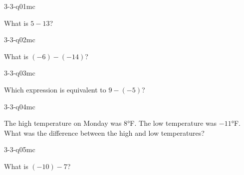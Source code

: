 

\begin{practiceQuestion}{3-3-q01}{mc}
\begin{questionText}
What is $5 - 13$?
\end{questionText}
\end{practiceQuestion}

\begin{practiceQuestion}{3-3-q02}{mc}
\begin{questionText}
What is $(-6) - (-14)$?
\end{questionText}
\end{practiceQuestion}

\begin{practiceQuestion}{3-3-q03}{mc}
\begin{questionText}
Which expression is equivalent to $9 - (-5)$?
\end{questionText}
\end{practiceQuestion}

\begin{practiceQuestion}{3-3-q04}{mc}
\begin{questionText}
The high temperature on Monday was $8°$F. The low temperature was $-11°$F. What was the difference between the high and low temperatures?
\end{questionText}
\end{practiceQuestion}

\begin{practiceQuestion}{3-3-q05}{mc}
\begin{questionText}
What is $(-10) - 7$?
\end{questionText}
\end{practiceQuestion}

